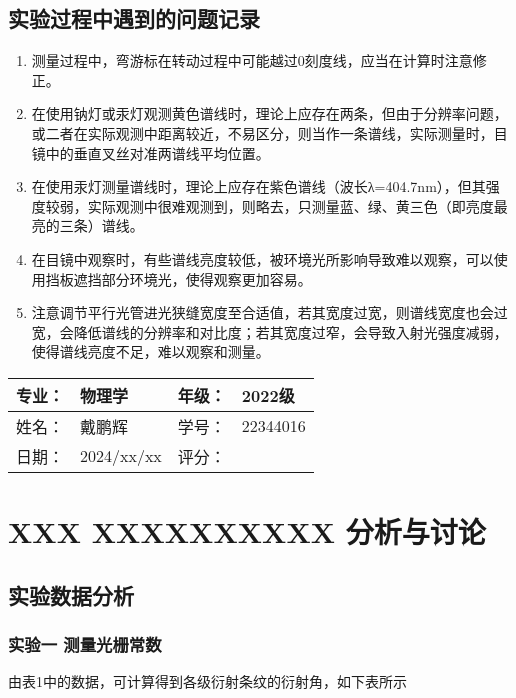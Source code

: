 \documentclass[dvipsnames, svgnames,a4paper,11pt]{article}
\begin{document}
\subsection{实验过程中遇到的问题记录}

\begin{enumerate}
	\item 	测量过程中，弯游标在转动过程中可能越过0刻度线，应当在计算时注意修正。
	
	\item 	在使用钠灯或汞灯观测黄色谱线时，理论上应存在两条，但由于分辨率问题，或二者在实际观测中距离较近，不易区分，则当作一条谱线，实际测量时，目镜中的垂直叉丝对准两谱线平均位置。
	
	\item 	在使用汞灯测量谱线时，理论上应存在紫色谱线（波长λ=404.7nm），但其强度较弱，实际观测中很难观测到，则略去，只测量蓝、绿、黄三色（即亮度最亮的三条）谱线。
	
	\item 	在目镜中观察时，有些谱线亮度较低，被环境光所影响导致难以观察，可以使用挡板遮挡部分环境光，使得观察更加容易。
	
	\item 	注意调节平行光管进光狭缝宽度至合适值，若其宽度过宽，则谱线宽度也会过宽，会降低谱线的分辨率和对比度；若其宽度过窄，会导致入射光强度减弱，使得谱线亮度不足，难以观察和测量。
	
\end{enumerate}
	

\clearpage
\begin{table}
	\renewcommand\arraystretch{1.7}
	\begin{tabularx}{\textwidth}{|X|X|X|X|}
	\hline
	专业：& 物理学 &年级：& 2022级\\
	\hline
	姓名： & 戴鹏辉 & 学号：& 22344016\\
	\hline
    日期：& 2024/xx/xx & 评分： &\\
	\hline
	\end{tabularx}
\end{table}

\section{XXX \quad XXXXXXXXXX \quad\heiti 分析与讨论}

\subsection{实验数据分析}

	\subsubsection{实验一 测量光栅常数}
		由表1中的数据，可计算得到各级衍射条纹的衍射角，如下表所示
		
\end{document}
